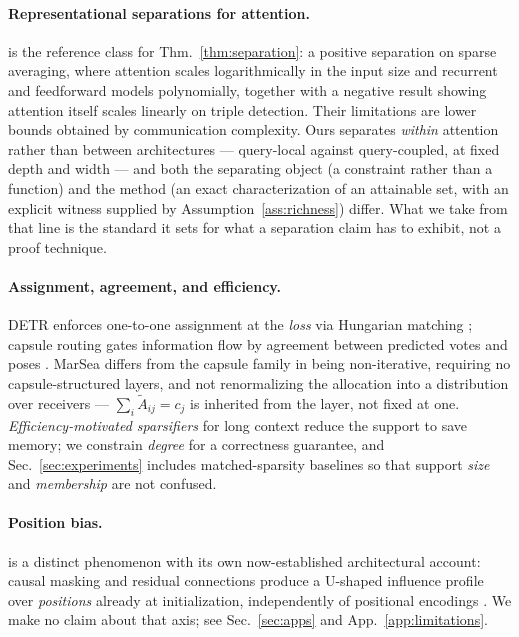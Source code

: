 \documentclass{article}
\begin{document}
\paragraph{Representational separations for attention.} \citet{sanford2023representational} is
the reference class for Thm.~\ref{thm:separation}: a positive separation on sparse averaging,
where attention scales logarithmically in the input size and recurrent and feedforward models
polynomially, together with a negative result showing attention itself scales linearly on triple
detection. Their limitations are lower bounds obtained by communication complexity. Ours
separates \emph{within} attention rather than between architectures --- query-local against
query-coupled, at fixed depth and width --- and both the separating object (a constraint rather
than a function) and the method (an exact characterization of an attainable set, with an explicit
witness supplied by Assumption~\ref{ass:richness}) differ. What we take from that line is the
standard it sets for what a separation claim has to exhibit, not a proof technique.

\paragraph{Assignment, agreement, and efficiency.} DETR enforces one-to-one assignment at the
\emph{loss} via Hungarian matching \citep{carion2020end}; capsule routing gates information flow
by agreement between predicted votes and poses \citep{sabour2017dynamic}. MarSea differs from the
capsule family in being non-iterative, requiring no capsule-structured layers, and not
renormalizing the allocation into a distribution over receivers --- $\sum_i \tilde A_{ij}=c_j$
is inherited from the layer, not fixed at one. \emph{Efficiency-motivated sparsifiers} for long context
\citep{xiao2024efficient} reduce the support to save memory; we constrain \emph{degree} for a
correctness guarantee, and Sec.~\ref{sec:experiments} includes matched-sparsity baselines so
that support \emph{size} and \emph{membership} are not confused.

\paragraph{Position bias.} \citet{liu2023lost} is a distinct phenomenon with its own
now-established architectural account: causal masking and residual connections produce a U-shaped
influence profile over \emph{positions} already at initialization, independently of positional
encodings \citep{chowdhury2026birth,wu2025emergence,herasimchyk2026residual}. We make no claim
about that axis; see Sec.~\ref{sec:apps} and App.~\ref{app:limitations}.
\end{document}

